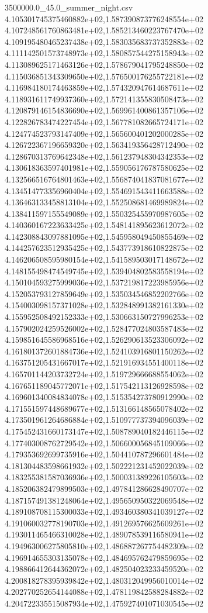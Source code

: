 \begin{filecontents*}{3500000.0_45.0_summer_night.csv}
4.105301745375460882e+02,1.587390873776248554e+02
4.107248561760863481e+02,1.585213460223767470e+02
4.109195480465237438e+02,1.583035683737352883e+02
4.111142501573748973e+02,1.580857544275158943e+02
4.113089625171463126e+02,1.578679041795248850e+02
4.115036851343309650e+02,1.576500176255722181e+02
4.116984180174463859e+02,1.574320947614687611e+02
4.118931611749937360e+02,1.572141355830508473e+02
4.120879146154836690e+02,1.569961400861357106e+02
4.122826783474227454e+02,1.567781082665724171e+02
4.124774523793147409e+02,1.565600401202000285e+02
4.126722367196659320e+02,1.563419356428712490e+02
4.128670313769642348e+02,1.561237948304342353e+02
4.130618363597401981e+02,1.559056176787580625e+02
4.132566516764801463e+02,1.556874041837081677e+02
4.134514773356960404e+02,1.554691543411663588e+02
4.136463133458813104e+02,1.552508681469989824e+02
4.138411597155549089e+02,1.550325455970987605e+02
4.140360167223633425e+02,1.548141895623612072e+02
4.142308843097881095e+02,1.545958049450855469e+02
4.144257623512935425e+02,1.543773918610822875e+02
4.146206508595980154e+02,1.541589503017148672e+02
4.148155498474549745e+02,1.539404802583558194e+02
4.150104593275999036e+02,1.537219817223985956e+02
4.152053793127859649e+02,1.535034546852202766e+02
4.154003098157371028e+02,1.532848991382161330e+02
4.155952508492152333e+02,1.530663150727996253e+02
4.157902024259526002e+02,1.528477024803587483e+02
4.159851645586968516e+02,1.526290613523306092e+02
4.161801372601884736e+02,1.524103916801150262e+02
4.163751205431667017e+02,1.521916934551400118e+02
4.165701144203732724e+02,1.519729666688554062e+02
4.167651189045772071e+02,1.517542113126928598e+02
4.169601340084834078e+02,1.515354273780912990e+02
4.171551597448689677e+02,1.513166148565078402e+02
4.173501961264686884e+02,1.510977737394096039e+02
4.175452431660173147e+02,1.508789040182446115e+02
4.177403008762729542e+02,1.506600056845109066e+02
4.179353692699735916e+02,1.504410787296601484e+02
4.181304483598661932e+02,1.502221231452022039e+02
4.183255381587036936e+02,1.500031389226105603e+02
4.185206382479899503e+02,1.497841286628490707e+02
4.187157491381248064e+02,1.495650950322069548e+02
4.189108708115300033e+02,1.493460380341039127e+02
4.191060032778190703e+02,1.491269576625609261e+02
4.193011465466310028e+02,1.489078539116580941e+02
4.194963006275805810e+02,1.486887267754482309e+02
4.196914655303135078e+02,1.484695762479859695e+02
4.198866412644362072e+02,1.482504023233459520e+02
4.200818278395939842e+02,1.480312049956010014e+02
4.202770252654144088e+02,1.478119842588284882e+02
4.204722335515087934e+02,1.475927401071030545e+02

\end{filecontents*}
